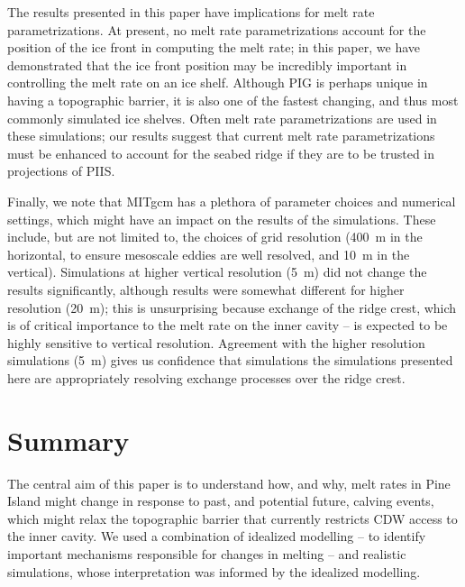 \documentclass[draft]{agujournal2019}
\begin{document}
The results presented in this paper have implications for melt rate parametrizations. At present, no melt rate parametrizations account for the position of the ice front in computing the melt rate; in this paper, we have demonstrated that the ice front position may be incredibly important in controlling the melt rate on an ice shelf. Although PIG is perhaps unique in having a topographic barrier, it is also one of the fastest changing, and thus most commonly simulated ice shelves. Often melt rate parametrizations are used in these simulations; our results suggest that current melt rate parametrizations must be enhanced to account for the seabed ridge if they are to be trusted in projections of PIIS.

Finally, we note that MITgcm has a plethora of parameter choices and numerical settings, which might have an impact on the results of the simulations. These include, but are not limited to, the choices of grid resolution (400~m in the horizontal, to ensure mesoscale eddies are well resolved, and 10~m in the vertical). Simulations at higher vertical resolution (5~m) did not change the results significantly, although results were somewhat different for higher resolution (20~m); this is unsurprising because exchange of the ridge crest,  which is of critical importance to the melt rate on the inner cavity -- is expected to be highly sensitive to vertical resolution. Agreement with the higher resolution simulations (5~m) gives us confidence that simulations the simulations presented here are appropriately resolving exchange processes over the ridge crest.

\section{Summary}\label{S:Summary}
The central aim of this paper is to understand how, and why, melt rates in Pine Island might change in response to past, and potential future, calving events, which might relax the topographic barrier that currently restricts CDW access to the inner cavity. We used a combination of idealized modelling -- to identify important mechanisms responsible for changes in melting -- and realistic simulations, whose interpretation was informed by the idealized modelling.
\end{document}
